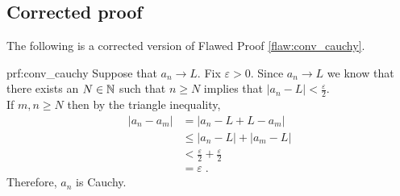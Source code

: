 \clearpage
\subsection{Corrected proof}

The following is a corrected version of Flawed Proof \ref{flaw:conv_cauchy}. %

\begin{prf}{prf:conv_cauchy} %
 Suppose that $a_n \rightarrow L$. Fix $\varepsilon> 0$. Since $a_n \rightarrow L$ we know that there exists an $N \in \mathbb N$ such that $n \geq N$ implies that $|a_n - L| < \frac{\varepsilon}{2}.$ \\
 
If $m,n \geq N$ then by the triangle inequality,
\begin{align*}
    |a_n - a_m| &= |a_n-L +L - a_m| \\ &\leq |a_n-L| + |a_m-L| \\
    &< \frac{\varepsilon}{2} + \frac{\varepsilon}{2} \\
    &= \varepsilon\;.
\end{align*}
Therefore, $a_n$ is Cauchy.
\end{prf}
